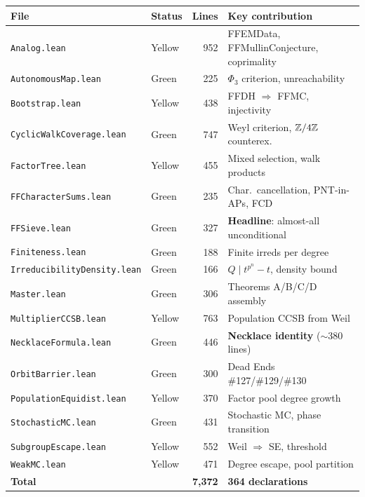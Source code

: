 \begin{center}
\renewcommand{\arraystretch}{1.2}
\begin{longtable}{llrl}
\toprule
\textbf{File} & \textbf{Status} & \textbf{Lines} & \textbf{Key contribution} \\
\midrule
\endhead
\texttt{Analog.lean} & Yellow & 952 & FFEMData, FFMullinConjecture, coprimality \\
\texttt{AutonomousMap.lean} & Green & 225 & $\Phi_3$ criterion, unreachability \\
\texttt{Bootstrap.lean} & Yellow & 438 & FFDH $\Rightarrow$ FFMC, injectivity \\
\texttt{CyclicWalkCoverage.lean} & Green & 747 & Weyl criterion, $\mathbb{Z}/4\mathbb{Z}$ counterex. \\
\texttt{FactorTree.lean} & Yellow & 455 & Mixed selection, walk products \\
\texttt{FFCharacterSums.lean} & Green & 235 & Char.\ cancellation, PNT-in-APs, FCD \\
\texttt{FFSieve.lean} & Green & 327 & \textbf{Headline}: almost-all unconditional \\
\texttt{Finiteness.lean} & Green & 188 & Finite irreds per degree \\
\texttt{IrreducibilityDensity.lean} & Green & 166 & $Q \mid t^{p^n} - t$, density bound \\
\texttt{Master.lean} & Green & 306 & Theorems A/B/C/D assembly \\
\texttt{MultiplierCCSB.lean} & Yellow & 763 & Population CCSB from Weil \\
\texttt{NecklaceFormula.lean} & Green & 446 & \textbf{Necklace identity} ($\sim$380 lines) \\
\texttt{OrbitBarrier.lean} & Green & 300 & Dead Ends \#127/\#129/\#130 \\
\texttt{PopulationEquidist.lean} & Yellow & 370 & Factor pool degree growth \\
\texttt{StochasticMC.lean} & Green & 431 & Stochastic MC, phase transition \\
\texttt{SubgroupEscape.lean} & Yellow & 552 & Weil $\Rightarrow$ SE, threshold \\
\texttt{WeakMC.lean} & Yellow & 471 & Degree escape, pool partition \\
\midrule
\textbf{Total} & & \textbf{7{,}372} & \textbf{364 declarations} \\
\bottomrule
\end{longtable}
\end{center}

